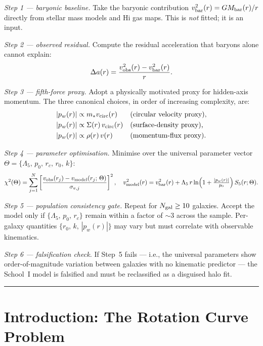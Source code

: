 \documentclass[11pt,a4paper]{article}
\newcommand{\pw}{p_w}                        %
\newcommand{\Lf}{\Lambda_5}                  %
\newcommand{\Sfive}{S_5}                     %
\newcommand{\vobs}{v_{\rm obs}}              %
\newcommand{\vbar}{v_{\rm bar}}              %
\newcommand{\vmod}{v_{\rm model}}            %
\begin{document}
\begin{center}
\begin{minipage}{0.90\textwidth}
\medskip
\noindent\textit{Step 1 — baryonic baseline.}\enspace
Take the baryonic contribution $\vbar^2(r) = GM_{\rm bar}(r)/r$ directly
from stellar mass models and H{\sc i} gas maps.  This is \emph{not} fitted;
it is an input.

\medskip
\noindent\textit{Step 2 — observed residual.}\enspace
Compute the residual acceleration that baryons alone cannot explain:
\[
  \Delta a(r) = \frac{\vobs^2(r) - \vbar^2(r)}{r} .
\]

\medskip
\noindent\textit{Step 3 — fifth-force proxy.}\enspace
Adopt a physically motivated proxy for hidden-axis momentum.
The three canonical choices, in order of increasing complexity, are:
\begin{align*}
  |\pw(r)| &\propto m_* v_{\rm circ}(r)
  & &\text{(circular velocity proxy),} \\
  |\pw(r)| &\propto \Sigma(r)\,v_{\rm circ}(r)
  & &\text{(surface-density proxy),} \\
  |\pw(r)| &\propto \rho(r)\,v(r)
  & &\text{(momentum-flux proxy).}
\end{align*}

\medskip
\noindent\textit{Step 4 — parameter optimisation.}\enspace
Minimise over the universal parameter vector
$\Theta = \{\Lf,\,p_0,\,r_c,\,r_0,\,k\}$:
\[
  \chi^2(\Theta) = \sum_{j=1}^{N}
  \left[\frac{\vobs(r_j) - \vmod(r_j;\,\Theta)}{\sigma_{v,j}}\right]^2,
  \quad
  \vmod^2(r) = \vbar^2(r)
  + \Lf\,r\ln\!\left(1+\tfrac{|\pw(r)|}{p_0}\right)\Sfive(r;\Theta) .
\]

\medskip
\noindent\textit{Step 5 — population consistency gate.}\enspace
Repeat for $N_{\rm gal} \geq 10$ galaxies.  Accept the model only if
$\{\Lf,\,p_0,\,r_c\}$ remain within a factor of $\sim$3 across the sample.
Per-galaxy quantities $\{r_0,\,k,\,|\pw(r)|\}$ may vary but must
correlate with observable kinematics.

\medskip
\noindent\textit{Step 6 — falsification check.}\enspace
If Step~5 fails --- i.e., the universal parameters show order-of-magnitude
variation between galaxies with no kinematic predictor --- the School~I
model is falsified and must be reclassified as a disguised halo fit.

\medskip
\rule{\textwidth}{0.5pt}
\end{minipage}
\end{center}
\newpage

\section{Introduction: The Rotation Curve Problem}\label{sec:intro}
\end{document}

